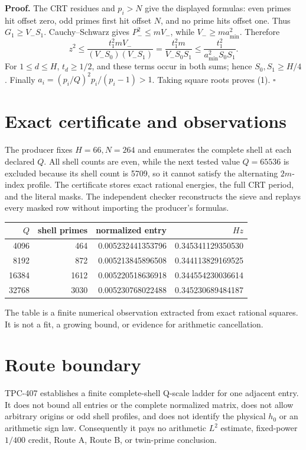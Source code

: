 \documentclass[11pt]{article}
\begin{document}
\textbf{Proof.}
The CRT residues and $p_i>N$ give the displayed formulas: even primes hit
offset zero, odd primes first hit offset $N$, and no prime hits offset one.
Thus $G_1\geq V_-S_1$.  Cauchy--Schwarz gives $P_-^2\leq mV_-$,
while $V_-\geq ma_{\min}^2$.  Therefore
\[
 z^2\leq\frac{t_1^2mV_-}{(V_-S_0)(V_-S_1)}
 =\frac{t_1^2m}{V_-S_0S_1}
 \leq\frac{t_1^2}{a_{\min}^2S_0S_1}. \tag{2}
\]
For $1\leq d\leq H$, $t_d\geq1/2$, and these terms occur in both sums;
hence $S_0,S_1\geq H/4$.  Finally
$a_i=(p_i/Q)^2p_i/(p_i-1)>1$.  Taking square roots proves (1). \hfill$\square$

\section{Exact certificate and observations}
The producer fixes $H=66,N=264$ and enumerates the complete shell at each
declared $Q$.  All shell counts are even, while the next tested value
$Q=65536$ is excluded because its shell count is 5709, so it cannot satisfy
the alternating $2m$-index profile.  The certificate stores exact rational
energies, the full CRT period, and the literal masks.  The independent
checker reconstructs the sieve and replays every masked row without
importing the producer's formulas.

\begin{center}
\begin{tabular}{@{}rrrr@{}}
\toprule
$Q$ & shell primes & normalized entry & $H z$\\
\midrule
4096  & 464  & 0.005232441353796 & 0.345341129350530\\
8192  & 872  & 0.005213845896508 & 0.344113829169525\\
16384 & 1612 & 0.005220518636918 & 0.344554230036614\\
32768 & 3030 & 0.005230768022488 & 0.345230689484187\\
\bottomrule
\end{tabular}
\end{center}

The table is a finite numerical observation extracted from exact rational
squares.  It is not a fit, a growing bound, or evidence for arithmetic
cancellation.

\section{Route boundary}
TPC-407 establishes a finite complete-shell Q-scale ladder for one adjacent
entry.  It does not bound all entries or the complete normalized matrix,
does not allow arbitrary origins or odd shell profiles, and does not identify
the physical $h_0$ or an arithmetic sign law.  Consequently it pays no
arithmetic $L^2$ estimate, fixed-power $1/400$ credit, Route A, Route B, or
twin-prime conclusion.
\end{document}

